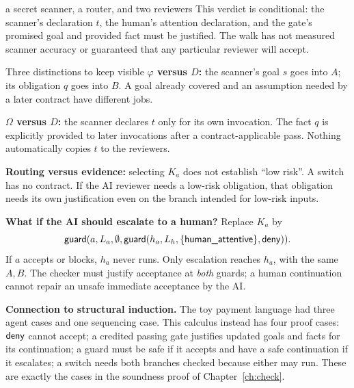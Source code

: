 \begin{example}{a secret scanner, a router, and two reviewers}
This verdict is conditional: the scanner's declaration $t$, the human's attention declaration, and the gate's promised goal and provided fact must be justified. The walk has not measured scanner accuracy or guaranteed that any particular reviewer will accept.
\end{example}

\begin{warning}{Three distinctions to keep visible}
\textbf{$\varphi$ versus $D$:} the scanner's goal $s$ goes into $A$; its obligation $q$ goes into $B$. A goal already covered and an assumption needed by a later contract have different jobs.

\textbf{$\Omega$ versus $D$:} the scanner declares $t$ only for its own invocation. The fact $q$ is explicitly provided to later invocations after a contract-applicable pass. Nothing automatically copies $t$ to the reviewers.

\textbf{Routing versus evidence:} selecting $K_a$ does not establish ``low risk''. A switch has no contract. If the AI reviewer needs a low-risk obligation, that obligation needs its own justification even on the branch intended for low-risk inputs.
\end{warning}

\textbf{What if the AI should escalate to a human?} Replace $K_a$ by
\[
\mathsf{guard}(a,L_a,\emptyset,
       \mathsf{guard}(h_a,L_h,\{\textsf{human\_attentive}\},\mathsf{deny})).
\]
If $a$ accepts or blocks, $h_a$ never runs. Only escalation reaches $h_a$, with the same $A,B$. The checker must justify acceptance at \emph{both} guards; a human continuation cannot repair an unsafe immediate acceptance by the AI.


\textbf{Connection to structural induction.} The toy payment language had three agent cases and one sequencing case. This calculus instead has four proof cases: $\mathsf{deny}$ cannot accept; a credited passing gate justifies updated goals and facts for its continuation; a guard must be safe if it accepts and have a safe continuation if it escalates; a switch needs both branches checked because either may run. These are exactly the cases in the soundness proof of Chapter~\ref{ch:check}.

